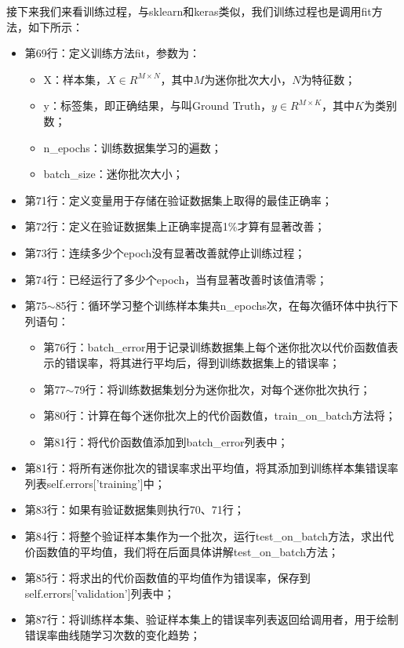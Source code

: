 \documentclass[UTF8]{article}
\begin{document}
接下来我们来看训练过程，与sklearn和keras类似，我们训练过程也是调用fit方法，如下所示：
\begin{itemize}
\item 第69行：定义训练方法fit，参数为：
	\begin{itemize}
	\item X：样本集，$X \in R^{M \times N}$，其中$M$为迷你批次大小，$N$为特征数；
	\item y：标签集，即正确结果，与叫Ground Truth，$y \in R^{M \times K}$，其中$K$为类别数；
	\item n\_epochs：训练数据集学习的遍数；
	\item batch\_size：迷你批次大小；
	\end{itemize}
\item 第71行：定义变量用于存储在验证数据集上取得的最佳正确率；
\item 第72行：定义在验证数据集上正确率提高1\%才算有显著改善；
\item 第73行：连续多少个epoch没有显著改善就停止训练过程；
\item 第74行：已经运行了多少个epoch，当有显著改善时该值清零；
\item 第75$\sim$85行：循环学习整个训练样本集共n\_epochs次，在每次循环体中执行下列语句：
	\begin{itemize}
	\item 第76行：batch\_error用于记录训练数据集上每个迷你批次以代价函数值表示的错误率，将其进行平均后，得到训练数据集上的错误率；
	\item 第77$\sim$79行：将训练数据集划分为迷你批次，对每个迷你批次执行；
	\item 第80行：计算在每个迷你批次上的代价函数值，train\_on\_batch方法将；
	\item 第81行：将代价函数值添加到batch\_error列表中；
	\end{itemize}
\item 第81行：将所有迷你批次的错误率求出平均值，将其添加到训练样本集错误率列表self.errors['training']中；
\item 第83行：如果有验证数据集则执行70、71行；
\item 第84行：将整个验证样本集作为一个批次，运行test\_on\_batch方法，求出代价函数值的平均值，我们将在后面具体讲解test\_on\_batch方法；
\item 第85行：将求出的代价函数值的平均值作为错误率，保存到self.errors['validation']列表中；
\item 第87行：将训练样本集、验证样本集上的错误率列表返回给调用者，用于绘制错误率曲线随学习次数的变化趋势；
\end{itemize}
\end{document}
